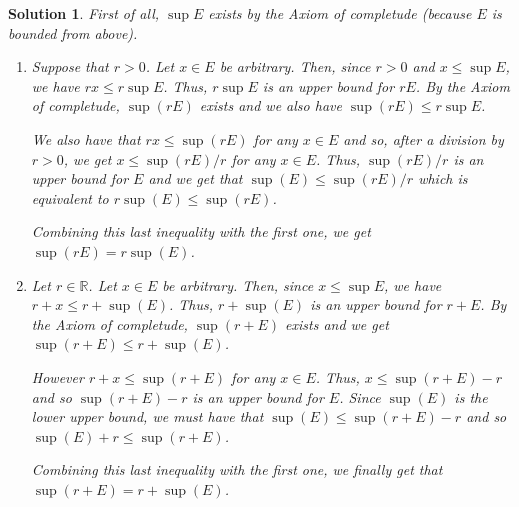 \documentclass[12pt]{article}
\newcommand{\bR}{\mathbb{R}}
\theoremstyle{plain}
\theoremstyle{plain}
\theoremstyle{plain}
\newtheorem*{solWP}{\textbf{Solution}}}
\theoremstyle{plain}
\begin{document}
\begin{solWP}
First of all, $\sup E$ exists by the Axiom of completude (because $E$ is bounded from above).
\begin{enumerate}[label=\textbf{\alph*)}]
\item Suppose that $r > 0$. Let $x \in E$ be arbitrary. Then, since $r > 0$ and $x \leq \sup E$, we have $rx \leq r \sup E$. Thus, $r \sup E$ is an upper bound for $rE$. By the Axiom of completude, $\sup (rE)$ exists and we also have $\sup (rE) \leq r \sup E$. 

We also have that $rx \leq \sup (rE)$ for any $x \in E$ and so, after a division by $r > 0$, we get $x \leq \sup (rE)/ r$ for any $x \in E$. Thus, $\sup (rE)/r$ is an upper bound for $E$ and we get that $\sup (E) \leq \sup (rE)/r$ which is equivalent to $r \sup (E) \leq \sup (rE)$. 

Combining this last inequality with the first one, we get $\sup (rE ) = r \sup (E)$.
\item Let $r \in \bR$. Let $x \in E$ be arbitrary. Then, since $x \leq \sup E$, we have $r + x \leq r + \sup (E)$. Thus, $r + \sup (E)$ is an upper bound for $r + E$. By the Axiom of completude, $\sup (r + E)$ exists and we get $\sup (r + E) \leq r + \sup (E)$.

However $r + x \leq \sup (r + E )$ for any $x \in E$. Thus, $x \leq \sup (r + E) - r$ and so $\sup (r + E) - r$ is an upper bound for $E$. Since $\sup (E)$ is the lower upper bound, we must have that $\sup (E) \leq \sup (r + E) - r$ and so $\sup (E) + r \leq \sup (r + E)$.

Combining this last inequality with the first one, we finally get that $\sup (r + E) = r + \sup (E)$.
\end{enumerate}
\end{solWP}
\end{document}
